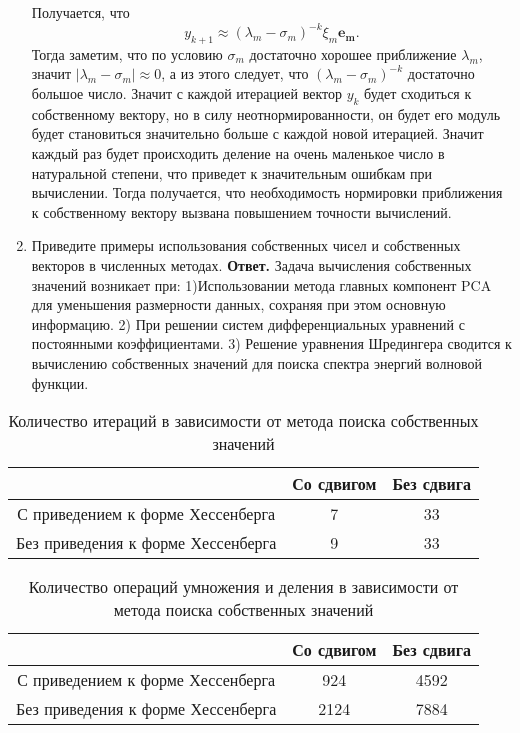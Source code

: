 \documentclass{article}
\begin{document}
\begin{enumerate}
        Получается, что 
        \begin{equation*}
            y_{k+1} \approx (\lambda_m - \sigma_m)^{-k} \xi_m \boldsymbol{e_m}.
        \end{equation*}
        Тогда заметим, что по условию $\sigma_m$ достаточно хорошее приближение $\lambda_m$, значит 
        \mbox{$|\lambda_m - \sigma_m| \approx 0$}, а из этого следует, что $(\lambda_m - \sigma_m)^{-k}$ достаточно большое число. 
        Значит с каждой итерацией вектор $y_k$ будет сходиться к собственному вектору, но в силу неотнормированности, 
        он будет его модуль будет становиться значительно больше с каждой новой итерацией. Значит каждый раз будет 
        происходить деление на очень маленькое число в натуральной степени, что приведет к значительным ошибкам при вычислении. Тогда получается, 
        что необходимость нормировки приближения к собственному вектору вызвана повышением точности вычислений.

        \item Приведите примеры использования собственных чисел
        и собственных векторов в численных методах.
        \newline
        {\bfseries Ответ. } 
        Задача вычисления собственных значений возникает при: 1)Использовании метода главных компонент PCA для уменьшения размерности данных, сохраняя при этом основную информацию. 2) При решении систем дифференциальных уравнений с постоянными коэффициентами. 3) Решение уравнения Шредингера сводится к вычислению собственных значений для поиска спектра энергий волновой функции.
    \end{enumerate}  

\newpage
    \begin{table}[h!]
        \centering
        \caption{Количество итераций в зависимости от метода поиска собственных значений}
        \begin{tabular}{|c|c|c|}
        \hline
        & Со сдвигом & Без сдвига\\
        \hline 
        С приведением к форме Хессенберга &7 &33 \\ 
        \hline 
        Без приведения к форме Хессенберга & 9 &33 \\
        \hline
        \end{tabular}
    \end{table}
    \begin{table}[h!]
        \centering
        \caption{Количество операций умножения и деления в зависимости от метода поиска собственных значений}
        \begin{tabular}{|c|c|c|}
        \hline
        & Со сдвигом & Без сдвига\\
        \hline 
        С приведением к форме Хессенберга & 924 & 4592 \\ 
        \hline 
        Без приведения к форме Хессенберга & 2124 & 7884 \\
        \hline
        \end{tabular}
    \end{table}
    
\end{document}
